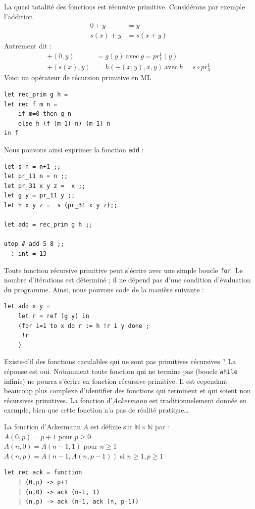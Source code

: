 \documentclass[11pt]{book}
\begin{document}
La quasi totalité des fonctions est récursive primitive. Considérons par exemple l'addition.
\begin{align*}
	0 + y &= y  \\
	s(x) + y &= s(x+y) 
\end{align*}
Autrement dit :
\begin{align*}
	+ (0, y) &=  g(y)\ \text{avec}\ g=pr_1^1 (y) \\
	+ (s(x), y) &= h (+(x, y), x, y)\ \text{avec}\ h=s \circ  pr_3^1
\end{align*}
Voici un opérateur de récursion primitive en ML
\begin{Verbatim}
let rec_prim g h = 
let rec f m n = 
	if m=0 then g n 
	else h (f (m-1) n) (m-1) n
in f 
\end{Verbatim}
Nous pouvons ainsi exprimer la fonction \verb+add+ :
\begin{Verbatim}
let s n = n+1 ;;
let pr_11 n = n ;;
let pr_31 x y z =  x ;;
let g y = pr_11 y ;;
let h x y z =  s (pr_31 x y z);;

let add = rec_prim g h ;;

utop # add 5 8 ;;
- : int = 13
\end{Verbatim}
Toute fonction récursive primitive peut s'écrire avec une simple boucle \verb+for+.
Le nombre d'itérations est déterminé ; il ne dépend pas d'une condition d'évaluation du programme.
Ainsi, nous pouvons code de la manière suivante :
\begin{Verbatim}
let add x y =
	let r = ref (g y) in
	(for i=1 to x do r := h !r i y done ; 
	 !r
	)
\end{Verbatim}
Existe-t'il des fonctions caculables qui ne sont pas primitives récursives ?
La réponse est oui. Notamment toute fonction qui ne termine pas (boucle \verb+while+ infinie)
ne pourra s'écrire en fonction récursive primitive.
Il est cependant beaucoup plus complexe d'identifier des fonctions qui terminent et qui soient non récursives primitives.
La fonction d'\textit{Ackermann} est traditionnelement donnée en exemple, bien que cette fonction n'a pas
de réalité pratique\dots

La fonction d’Ackermann $A$ est définie sur $\mathbb{N} × \mathbb{N}$ par : \\
$A(0, p) = p + 1$ pour $p ≥ 0$ \\
$A(n, 0) = A(n − 1, 1)$ pour $n ≥ 1$ \\
$A(n, p) = A(n − 1, A(n, p − 1))$ si $n ≥ 1, p ≥ 1$ \\ 

\begin{Verbatim}
let rec ack = function
	| (0,p) -> p+1
	| (n,0) -> ack (n-1, 1)
	| (n,p) -> ack (n-1, ack (n, p-1))
\end{Verbatim}
\end{document}
